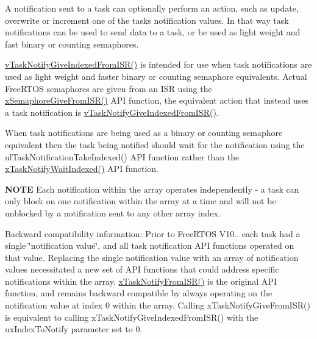 A notification sent to a task can optionally perform an action, such as update, overwrite or increment one of the task\textquotesingle{}s notification values. In that way task notifications can be used to send data to a task, or be used as light weight and fast binary or counting semaphores.

\hyperlink{externals_2freertos_2include_2task_8h_a756fe3c4656aaaa8ef6d309e0078e132}{v\+Task\+Notify\+Give\+Indexed\+From\+I\+S\+R()} is intended for use when task notifications are used as light weight and faster binary or counting semaphore equivalents. Actual Free\+R\+T\+OS semaphores are given from an I\+SR using the \hyperlink{externals_2freertos_2include_2semphr_8h_a68aa43df8b2a0dbe17d05fad74670ef0}{x\+Semaphore\+Give\+From\+I\+S\+R()} A\+PI function, the equivalent action that instead uses a task notification is \hyperlink{externals_2freertos_2include_2task_8h_a756fe3c4656aaaa8ef6d309e0078e132}{v\+Task\+Notify\+Give\+Indexed\+From\+I\+S\+R()}.

When task notifications are being used as a binary or counting semaphore equivalent then the task being notified should wait for the notification using the ul\+Task\+Notification\+Take\+Indexed() A\+PI function rather than the \hyperlink{externals_2freertos_2include_2task_8h_a5bcd5a5b7d7c41dd782a38093be1b7c9}{x\+Task\+Notify\+Wait\+Indexed()} A\+PI function.

{\bfseries N\+O\+TE} Each notification within the array operates independently -\/ a task can only block on one notification within the array at a time and will not be unblocked by a notification sent to any other array index.

Backward compatibility information\+: Prior to Free\+R\+T\+OS V10.. each task had a single \char`\"{}notification value\char`\"{}, and all task notification A\+PI functions operated on that value. Replacing the single notification value with an array of notification values necessitated a new set of A\+PI functions that could address specific notifications within the array. \hyperlink{externals_2freertos_2include_2task_8h_a1ed9129068b96a909356bd0369c5ecb0}{x\+Task\+Notify\+From\+I\+S\+R()} is the original A\+PI function, and remains backward compatible by always operating on the notification value at index 0 within the array. Calling x\+Task\+Notify\+Give\+From\+I\+S\+R() is equivalent to calling x\+Task\+Notify\+Give\+Indexed\+From\+I\+S\+R() with the ux\+Index\+To\+Notify parameter set to 0.


